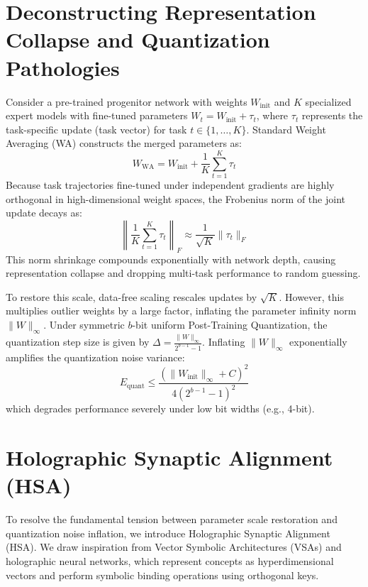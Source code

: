 \documentclass{article}
\theoremstyle{plain}
\theoremstyle{definition}
\theoremstyle{remark}
\begin{document}
\section{Deconstructing Representation Collapse and Quantization Pathologies}
Consider a pre-trained progenitor network with weights $W_\text{init}$ and $K$ specialized expert models with fine-tuned parameters $W_t = W_\text{init} + \tau_t$, where $\tau_t$ represents the task-specific update (task vector) for task $t \in \{1, \dots, K\}$. Standard Weight Averaging (WA) constructs the merged parameters as:
\begin{equation}
    W_\text{WA} = W_\text{init} + \frac{1}{K} \sum_{t=1}^K \tau_t
\end{equation}
Because task trajectories fine-tuned under independent gradients are highly orthogonal in high-dimensional weight spaces, the Frobenius norm of the joint update decays as:
\begin{equation}
    \left\| \frac{1}{K} \sum_{t=1}^K \tau_t \right\|_F \approx \frac{1}{\sqrt{K}} \|\tau_t\|_F
\end{equation}
This norm shrinkage compounds exponentially with network depth, causing representation collapse and dropping multi-task performance to random guessing.

To restore this scale, data-free scaling rescales updates by $\sqrt{K}$. However, this multiplies outlier weights by a large factor, inflating the parameter infinity norm $\|W\|_\infty$. Under symmetric $b$-bit uniform Post-Training Quantization, the quantization step size is given by $\Delta = \frac{\|W\|_\infty}{2^{b-1}-1}$. Inflating $\|W\|_\infty$ exponentially amplifies the quantization noise variance:
\begin{equation}
    E_\text{quant} \le \frac{(\|W_\text{init}\|_\infty + C)^2}{4(2^{b-1}-1)^2}
\end{equation}
which degrades performance severely under low bit widths (e.g., 4-bit).

\section{Holographic Synaptic Alignment (HSA)}
To resolve the fundamental tension between parameter scale restoration and quantization noise inflation, we introduce Holographic Synaptic Alignment (HSA). We draw inspiration from Vector Symbolic Architectures (VSAs) and holographic neural networks, which represent concepts as hyperdimensional vectors and perform symbolic binding operations using orthogonal keys.
\end{document}
